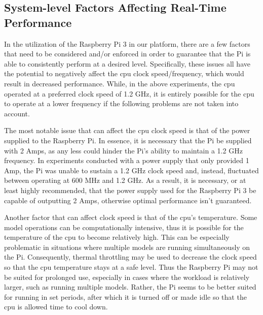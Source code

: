 
\subsection{System-level Factors Affecting Real-Time Performance}
In the utilization of the Raspberry Pi 3 in our platform, there are a
few factors that need to be considered and/or enforced in order to
guarantee that the Pi is able to consistently perform at a desired
level. Specifically, these issues all have the potential to negatively
affect the cpu clock speed/frequency, which would result in decreased
performance. While, in the above experiments, the cpu operated at a
preferred clock speed of 1.2 GHz, it is entirely possible for the cpu
to operate at a lower frequency if the following problems are not
taken into account. 

The most notable issue that can affect the cpu clock speed is that of
the power supplied to the Raspberry Pi. In essence, it is necessary
that the Pi be supplied with 2 Amps, as any less could hinder the Pi's
ability to maintain a 1.2 GHz frequency. In experiments conducted with
a power supply that only provided 1 Amp, the Pi was unable to sustain
a 1.2 GHz clock speed and, instead, fluctuated between operating at
600 MHz and 1.2 GHz. As a result, it is necessary, or at least highly
recommended, that the power supply used for the Raspberry Pi 3 be
capable of outputting 2 Amps, otherwise optimal performance isn't
guaranteed.

Another factor that can affect clock speed is that of the
cpu's temperature. Some model operations can be computationally
intensive, thus it is possible for the temperature of the cpu to
become relatively high. This can be especially problematic in
situations where multiple models are running  simultaneously on the
Pi. Consequently, thermal throttling may be used to decrease the clock
speed so that the cpu temperature stays at a safe level. Thus the
Raspberry Pi may not be suited for prolonged use, especially in cases
where the workload is relatively larger, such as running multiple
models. Rather, the Pi seems to be better suited for running in set
periods, after which it is turned  off or made idle so that the cpu is
allowed time to cool down. 

